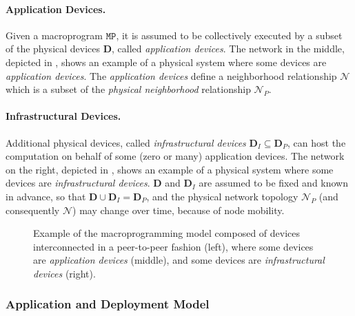 \paragraph{Application Devices.}
Given a macroprogram $\mathtt{MP}$,
 it is assumed to be collectively executed by a subset of the physical devices $\mathbf{D}$,
 called \emph{application devices}.
%
The network in the middle, depicted in , 
 shows an example of a physical system where some devices are \emph{application devices}.
%
The \emph{application devices} define a neighborhood relationship $\mathcal{N}$ 
 which is a subset of the \emph{physical neighborhood} relationship $\mathcal{N}_P$.

\paragraph{Infrastructural Devices.}
Additional physical devices, called \emph{infrastructural devices} $\mathbf{D}_I \subseteq \mathbf{D}_P$,
can host the computation on behalf of some (zero or many) application devices.
%
The network on the right, depicted in , 
 shows an example of a physical system where some devices are \emph{infrastructural devices}.
%
$\mathbf{D}$ and $\mathbf{D}_I$ are assumed to be fixed and known in advance,
 so that $\mathbf{D} \cup \mathbf{D}_I = \mathbf{D}_P$,
 and the physical network topology $\mathcal{N}_P$ (and consequently $\mathcal{N}$) may change over time,
 because of node mobility.

\begin{figure}[t]
  \centering
  \resizebox{\linewidth}{!}{%
  }
  \caption{
    Example of the macroprogramming model composed of devices interconnected
    in a peer-to-peer fashion (left), where some devices are
    \emph{application devices} (middle), and some devices are
    \emph{infrastructural devices} (right).
  }
  \label{fig:pulverization-model-all}
\end{figure}

\subsubsection{Application and Deployment Model}\label{sec:deployment-model}

